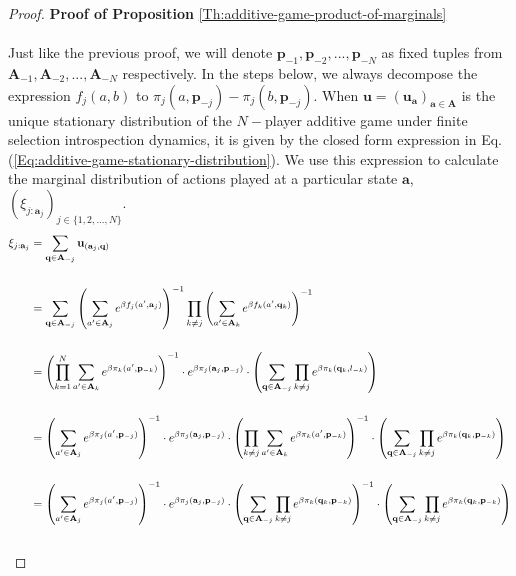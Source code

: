\documentclass[11pt]{article}
\theoremstyle{plainCl1}
\theoremstyle{plainCl2}
\newcommand{\A}{\mathbf{A}}
\newcommand{\abf}{\mathbf{a}}
\newcommand{\qbf}{\mathbf{q}}
\newcommand{\pbf}{\mathbf{p}}
\newcommand{\ubf}{\mathbf{u}}
\begin{document}
\begin{proof}
\textbf{Proof of Proposition} \ref{Th:additive-game-product-of-marginals} \\ \\ 
Just like the previous proof, we will denote $\pbf_{-1}, \pbf_{-2},...,\pbf_{-N} $ as fixed tuples from $\A_{-1}, \A_{-2},...,\A_{-N}$ respectively. In the steps below, we always decompose the expression $f_j(a,b)$ to $\pi_j(a,\pbf_{-j}) - \pi_j(b,\pbf_{-j})$. When $\ubf = (\ubf_\abf)_{\abf \in \A}$ is the unique stationary distribution of the $N-$player additive game under finite selection introspection dynamics, it is given by the closed form expression in Eq. (\ref{Eq:additive-game-stationary-distribution}). We use this expression to calculate the marginal distribution of actions played at a particular state $\abf$, $(\xi_{j:\abf_j})_{j \in \{1,2,...,N\}}$. 
\newpage
\begin{align}
\xi_{j:\abf_j} &= \sum_{\qbf \in \A_{-j}} \ubf_{(\abf_j,\qbf)} \\ \notag \\
&= \sum_{\qbf \in \A_{-j}} \left( \sum_{a' \in \A_j} \displaystyle e^{\beta f_j(a',\abf_j)}\right)^{-1} \prod_{k \neq j} \left( \sum_{a' \in \A_k} \displaystyle e^{\beta f_k(a',\qbf_k)}\right)^{-1} \\ \notag \\
&= \left( \prod_{k=1}^N \sum_{a' \in \A_k} \displaystyle e^{\beta \pi_k (a', \pbf_{-k})}\right)^{-1} \cdot \displaystyle e^{\beta \pi_j(\abf_j, \pbf_{-j})} \cdot \left( \sum_{\qbf \in \A_{-j}} \prod_{k \neq j} e^{\beta \pi_k(\qbf_k, l_{-k})} \right) \\ \notag \\
\label{step-prod-sum}
&= \left( \sum_{a' \in \A_j} \displaystyle e^{\beta \pi_j(a',\pbf_{-j})}\right)^{-1} \cdot \displaystyle e^{\beta \pi_j(\abf_j, \pbf_{-j})}\cdot \left( \prod_{k\neq j} \sum_{a' \in \A_k} \displaystyle e^{\beta \pi_k(a',\pbf_{-k})}\right)^{-1} \cdot \left( \sum_{\qbf \in \A_{-j}} \prod_{k \neq j} e^{\beta \pi_k(\qbf_k,\pbf_{-k})} \right) \\ \notag \\ 
\label{step-sum-prod}
&= \left( \sum_{a' \in \A_j} \displaystyle e^{\beta \pi_j(a',\pbf_{-j})}\right)^{-1} \cdot \displaystyle e^{\beta \pi_j(\abf_j, \pbf_{-j})}\cdot \left( \sum_{\qbf \in \A_{-j}} \prod_{k\neq j}  \displaystyle e^{\beta \pi_k(\qbf_k,\pbf_{-k})} \right)^{-1} \cdot \left( \sum_{\qbf \in \A_{-j}} \prod_{k \neq j} e^{\beta \pi_k(\qbf_k,\pbf_{-k})}  \right) \\ \notag \\ 

\end{align}
\end{proof}
\end{document}
